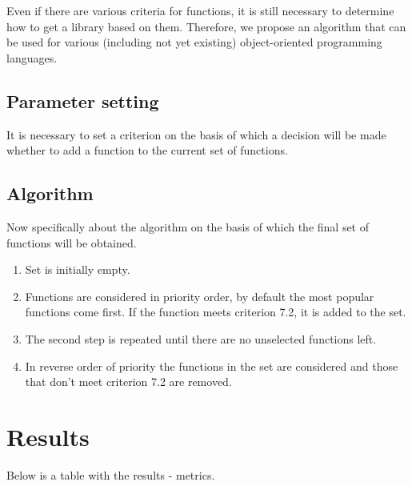 \documentclass[anonymous,sigplan,review,11pt,nonacm,natbib=false]{acmart}
\begin{document}
    Even if there are various criteria for functions, it is still necessary to determine how to get a library based on them. Therefore, we propose an algorithm that can be used for various (including not yet existing) object-oriented programming languages.

    \subsection{Parameter setting}

    It is necessary to set a criterion on the basis of which a decision will be made whether to add a function to the current set of functions.

    \subsection{Algorithm}

    Now specifically about the algorithm on the basis of which the final set of functions will be obtained.

    \begin{enumerate}
        \item Set is initially empty.
        \item Functions are considered in priority order, by default the most popular functions come first. If the function meets criterion 7.2, it is added to the set.
        \item The second step is repeated until there are no unselected functions left.
        \item In reverse order of priority the functions in the set are considered and those that don't meet criterion 7.2 are removed.
    \end{enumerate}

    \section{Results}

    Below is a table with the results - metrics.
\end{document}
